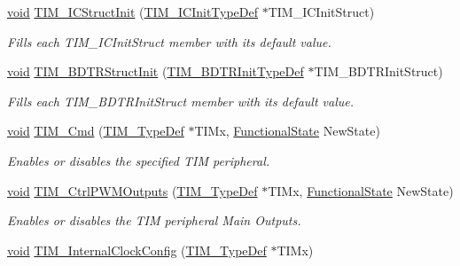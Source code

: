 \begin{DoxyCompactItemize}
\hyperlink{usb__devapi_8h_afabf60e7f57651d6d595a02c75f07cd0}{void} \hyperlink{group___t_i_m___exported___functions_ga5005dac8e4e8a4c7fc2a0ef05b77cc50}{T\+I\+M\+\_\+\+I\+C\+Struct\+Init} (\hyperlink{struct_t_i_m___i_c_init_type_def}{T\+I\+M\+\_\+\+I\+C\+Init\+Type\+Def} $\ast$T\+I\+M\+\_\+\+I\+C\+Init\+Struct)
\begin{DoxyCompactList}\small\item\em Fills each T\+I\+M\+\_\+\+I\+C\+Init\+Struct member with its default value. \end{DoxyCompactList}\item 
\hyperlink{usb__devapi_8h_afabf60e7f57651d6d595a02c75f07cd0}{void} \hyperlink{group___t_i_m___exported___functions_gaea0f49938cda8ae0738162194798afc6}{T\+I\+M\+\_\+\+B\+D\+T\+R\+Struct\+Init} (\hyperlink{struct_t_i_m___b_d_t_r_init_type_def}{T\+I\+M\+\_\+\+B\+D\+T\+R\+Init\+Type\+Def} $\ast$T\+I\+M\+\_\+\+B\+D\+T\+R\+Init\+Struct)
\begin{DoxyCompactList}\small\item\em Fills each T\+I\+M\+\_\+\+B\+D\+T\+R\+Init\+Struct member with its default value. \end{DoxyCompactList}\item 
\hyperlink{usb__devapi_8h_afabf60e7f57651d6d595a02c75f07cd0}{void} \hyperlink{group___t_i_m___exported___functions_ga2bdc275bcbd2ce9d1ba632e6c89896b7}{T\+I\+M\+\_\+\+Cmd} (\hyperlink{struct_t_i_m___type_def}{T\+I\+M\+\_\+\+Type\+Def} $\ast$T\+I\+Mx, \hyperlink{agilefox_2library_2inc_2stm32f10x__type_8h_ac9a7e9a35d2513ec15c3b537aaa4fba1}{Functional\+State} New\+State)
\begin{DoxyCompactList}\small\item\em Enables or disables the specified T\+IM peripheral. \end{DoxyCompactList}\item 
\hyperlink{usb__devapi_8h_afabf60e7f57651d6d595a02c75f07cd0}{void} \hyperlink{group___t_i_m___exported___functions_ga3e59ebced2ab8e0b817c460f1670e97d}{T\+I\+M\+\_\+\+Ctrl\+P\+W\+M\+Outputs} (\hyperlink{struct_t_i_m___type_def}{T\+I\+M\+\_\+\+Type\+Def} $\ast$T\+I\+Mx, \hyperlink{agilefox_2library_2inc_2stm32f10x__type_8h_ac9a7e9a35d2513ec15c3b537aaa4fba1}{Functional\+State} New\+State)
\begin{DoxyCompactList}\small\item\em Enables or disables the T\+IM peripheral Main Outputs. \end{DoxyCompactList}\item 
\hyperlink{usb__devapi_8h_afabf60e7f57651d6d595a02c75f07cd0}{void} \hyperlink{group___t_i_m___exported___functions_ga2394f0221709c0659874f9a4184cf86e}{T\+I\+M\+\_\+\+Internal\+Clock\+Config} (\hyperlink{struct_t_i_m___type_def}{T\+I\+M\+\_\+\+Type\+Def} $\ast$T\+I\+Mx)

\end{DoxyCompactItemize}
